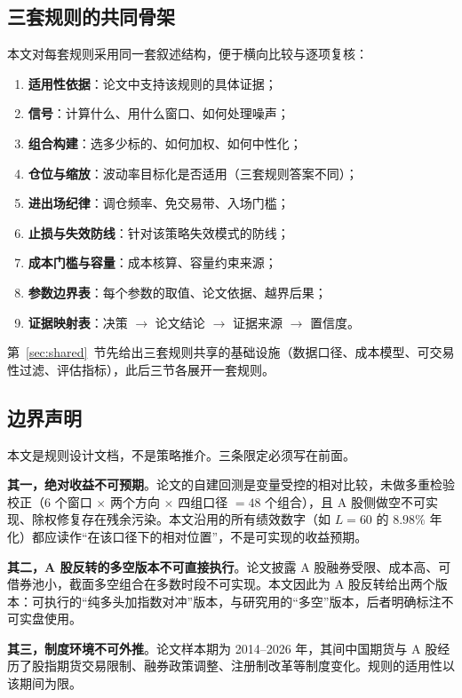 \subsection{三套规则的共同骨架}

本文对每套规则采用同一套叙述结构，便于横向比较与逐项复核：

\begin{enumerate}[leftmargin=2.2em]
  \item \textbf{适用性依据}：论文中支持该规则的具体证据；
  \item \textbf{信号}：计算什么、用什么窗口、如何处理噪声；
  \item \textbf{组合构建}：选多少标的、如何加权、如何中性化；
  \item \textbf{仓位与缩放}：波动率目标化是否适用（三套规则答案不同）；
  \item \textbf{进出场纪律}：调仓频率、免交易带、入场门槛；
  \item \textbf{止损与失效防线}：针对该策略失效模式的防线；
  \item \textbf{成本门槛与容量}：成本核算、容量约束来源；
  \item \textbf{参数边界表}：每个参数的取值、论文依据、越界后果；
  \item \textbf{证据映射表}：决策 $\to$ 论文结论 $\to$ 证据来源 $\to$ 置信度。
\end{enumerate}

第~\ref{sec:shared}~节先给出三套规则共享的基础设施（数据口径、成本模型、可交易性过滤、评估指标），此后三节各展开一套规则。

\subsection{边界声明}

本文是规则设计文档，不是策略推介。三条限定必须写在前面。

\textbf{其一，绝对收益不可预期}。论文的自建回测是变量受控的相对比较，未做多重检验校正（$6$ 个窗口 $\times$ 两个方向 $\times$ 四组口径 $=48$ 个组合），且 A 股侧做空不可实现、除权修复存在残余污染。本文沿用的所有绩效数字（如 $L=60$ 的 $8.98\%$ 年化）都应读作“在该口径下的相对位置”，不是可实现的收益预期。

\textbf{其二，A 股反转的多空版本不可直接执行}。论文披露 A 股融券受限、成本高、可借券池小，截面多空组合在多数时段不可实现。本文因此为 A 股反转给出两个版本：可执行的“纯多头加指数对冲”版本，与研究用的“多空”版本，后者明确标注不可实盘使用。

\textbf{其三，制度环境不可外推}。论文样本期为 2014--2026 年，其间中国期货与 A 股经历了股指期货交易限制、融券政策调整、注册制改革等制度变化。规则的适用性以该期间为限。
